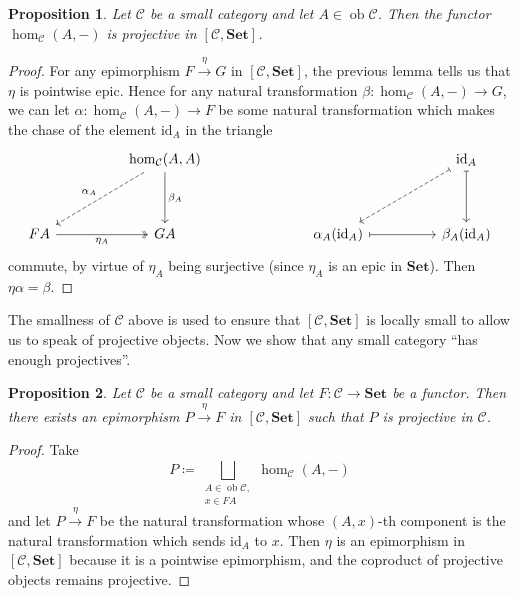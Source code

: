 \documentclass[a4paper,11pt]{article}
\theoremstyle{break_italics}
\newtheorem*{proposition*}{Proposition}
\theoremstyle{break_upright}
\theoremstyle{remark}
\newcommand{\id}{\mathrm{id}}
\newcommand{\ob}{\operatorname{ob}}
\newcommand{\C}{\mathcal{C}}
\newcommand{\Set}{\mathbf{Set}}
\begin{document}
\begin{proposition*}
Let $\C$ be a small category and let $A \in \ob\C$. Then the functor $\hom_\C(A,-)$ is projective in $[\C,\Set]$.
\end{proposition*}
\begin{proof}
	For any epimorphism $F \xrightarrow{\eta} G$ in $[\C,\Set]$, the previous lemma tells us that $\eta$ is pointwise epic. Hence for any natural transformation $\beta \colon \hom_\C(A,-) \to G$, we can let $\alpha \colon \hom_\C(A,-) \to F$ be some natural transformation which makes the chase of the element $\id_A$ in the triangle
\[
\begin{tikzcd}
                                    &  & {\hom_\C(A,A)} \arrow[dd, "\beta_A"] \arrow[lldd, "\alpha_A"', dashed] &  &  &                                     &  & \id_A \arrow[dd, maps to] \arrow[lldd, dashed, maps to] \\
                                    &  &                                                                        &  &  &                                     &  &                                                         \\
FA \arrow[rr, "\eta_A"', two heads] &  & GA                                                                     &  &  & \alpha_A(\id_A) \arrow[rr, maps to] &  & \beta_A(\id_A)                                         
\end{tikzcd}
\]
commute, by virtue of $\eta_A$ being surjective (since $\eta_A$ is an epic in $\Set$). Then $\eta\alpha = \beta$.
\end{proof}

The smallness of $\C$ above is used to ensure that $[\C,\Set]$ is locally small to allow us to speak of projective objects. Now we show that any small category ``has enough projectives''.

\begin{proposition*}
	Let $\C$ be a small category and let $F \colon \C \to \Set$ be a functor. Then there exists an epimorphism $P \xrightarrow{\eta} F$ in $[\C,\Set]$ such that $P$ is projective in $\C$.
\end{proposition*}
\begin{proof}
	Take
	\[
		P \coloneqq \bigsqcup_{\substack{A \in \ob\C, \\ x \in FA}} \hom_\C(A,-)
	\]
	and let $P \xrightarrow{\eta} F$ be the natural transformation whose $(A,x)$-th component is the natural transformation which sends $\id_A$ to $x$. Then $\eta$ is an epimorphism in $[\C,\Set]$ because it is a pointwise epimorphism, and the coproduct of projective objects remains projective.
\end{proof}
\end{document}
